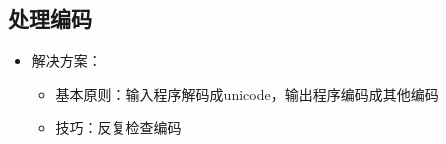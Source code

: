 \documentclass{beamer}
\begin{document}
\subsection{处理编码}
\begin{frame}
\begin{itemize}
  \item 解决方案：
  \begin{itemize}
    \item 基本原则：输入程序解码成unicode，输出程序编码成其他编码
    \item 技巧：反复检查编码 
  \end{itemize}
\end{itemize}
\end{frame}

% 
% 
\end{document}
